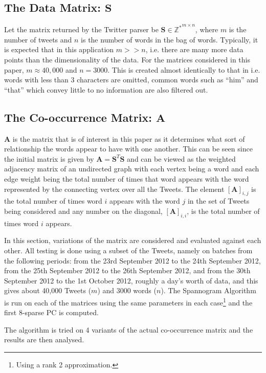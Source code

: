 \documentclass[graybox]{svmult}
\newcommand{\smat}{\mathbf{S}}
\newcommand{\covmat}{\mathbf{A}}
\newcommand{\tp}{^T}
\begin{document}
\subsection{The Data Matrix: $\smat$}
Let the matrix returned by the Twitter parser be $\mathbf{S} \in \mathbb{Z^*}^{m \times n}$, where $m$ is the number of tweets and $n$ is the number of words in the bag of words. Typically, it is expected that in this application $m >> n$, i.e. there are many more data points than the dimensionality of the data. For the matrices considered in this paper, $m \approx 40,000$ and $n = 3000$. This is created almost identically to that in \cite{dimakis} i.e. words with less than 3 characters are omitted, common words such as ``him'' and ``that'' which convey little to no information are also filtered out.

\subsection{The Co-occurrence Matrix: $\mathbf{A}$}
\label{covmat}

$\mathbf{A}$ is the matrix that is of interest in this paper as it determines what sort of relationship the words appear to have with one another. This can be seen since the initial matrix is given by $\covmat = \smat\tp\smat$ and can be viewed as the weighted adjacency matrix of an undirected graph with each vertex being a word and each edge weight being the total number of times that word appears with the word represented by the connecting vertex over all the Tweets. The element $[\covmat]_{i, j}$ is the total number of times word $i$ appears with the word $j$ in the set of Tweets being considered and any number on the diagonal, $[\covmat]_{i, i}$, is the total number of times word $i$ appears. 

In this section, variations of the matrix are considered and evaluated against each other. All testing is done using a subset of the Tweets, namely on batches from the following periods: from the 23rd September 2012 to the 24th September 2012, from the 25th September 2012 to the 26th September 2012, and from the 30th September 2012 to the 1st October 2012, roughly a day's worth of data, and this gives about 40,000 Tweets ($m$) and 3000 words ($n$). The Spannogram Algorithm is run on each of the matrices using the same parameters in each case\footnote{Using a rank 2 approximation.} and the first 8-sparse PC is computed.

The algorithm is tried on 4 variants of the actual co-occurrence matrix and the results are then analysed. 
\end{document}
